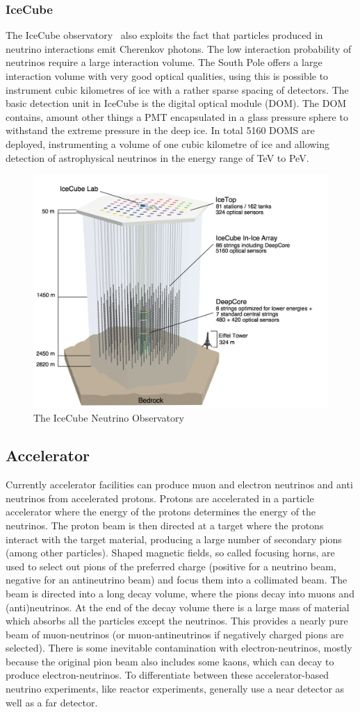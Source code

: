 \subsubsection{IceCube}
The IceCube observatory~\cite{43IceCube} also exploits the fact that particles produced in neutrino interactions emit Cherenkov photons. The low interaction probability of neutrinos require a large interaction volume. The South Pole offers a large interaction volume with very good optical qualities, using this is possible to instrument cubic kilometres of ice with a rather sparse spacing of detectors. The basic detection unit in IceCube is the digital optical module (DOM). The DOM contains, amount other things a PMT encapsulated in a glass pressure sphere to withstand the extreme pressure in the deep ice. In total 5160 DOMS are deployed, instrumenting a volume of one cubic kilometre of ice and allowing detection of astrophysical neutrinos in the energy range of TeV to PeV.

\begin{figure}
\centering
\includegraphics[width=.5\textwidth]{figures/IceCube.jpeg}
\caption{The IceCube Neutrino Observatory}
\end{figure}

\subsection{Accelerator}
Currently accelerator facilities can produce muon and electron neutrinos and anti neutrinos from accelerated protons. Protons are accelerated in a particle accelerator where the energy of the protons determines the energy of the neutrinos. The proton beam is then directed at a target where the protons interact with the target material, producing a large number of secondary pions (among other particles). Shaped magnetic fields, so called focusing horns, are used to select out pions of the preferred charge (positive for a neutrino beam, negative for an antineutrino beam) and focus them into a collimated beam. The beam is directed into a long decay volume, where the pions decay into muons and (anti)neutrinos. At the end of the decay volume there is a large mass of material which absorbs all the particles except the neutrinos. This provides a nearly pure beam of muon-neutrinos (or muon-antineutrinos if negatively charged pions are selected). There is some inevitable contamination with electron-neutrinos, mostly because the original pion beam also includes some kaons, which can decay to produce electron-neutrinos. To differentiate between these accelerator-based neutrino experiments, like reactor experiments, generally use a near detector as well as a far detector.

